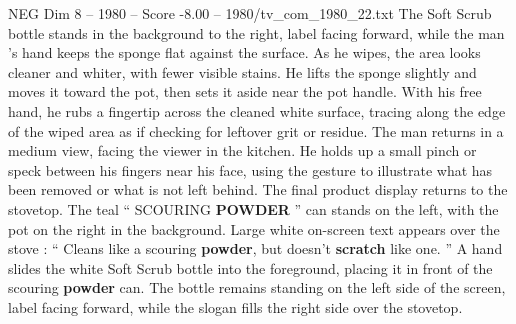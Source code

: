\begin{textsample}{NEG Dim 8 – 1980 – Score -8.00 – 1980/tv\_com\_1980\_22.txt}
The Soft Scrub bottle stands in the background to the right, label facing forward, while the man ’s hand keeps the sponge flat against the surface.
As he wipes, the area looks cleaner and whiter, with fewer visible stains.
He lifts the sponge slightly and moves it toward the pot, then sets it aside near the pot handle.
With his free hand, he rubs a fingertip across the cleaned white surface, tracing along the edge of the wiped area as if checking for leftover grit or residue.
The man returns in a medium view, facing the viewer in the kitchen.
He holds up a small pinch or speck between his fingers near his face, using the gesture to illustrate what has been removed or what is not left behind.
The final product display returns to the stovetop.
The teal “ SCOURING \textbf{POWDER} ” can stands on the left, with the pot on the right in the background.
Large white on-screen text appears over the stove : “ Cleans like a scouring \textbf{powder}, but doesn't \textbf{scratch} like one. ” A hand slides the white Soft Scrub bottle into the foreground, placing it in front of the scouring \textbf{powder} can.
The bottle remains standing on the left side of the screen, label facing forward, while the slogan fills the right side over the stovetop.

\end{textsample}
